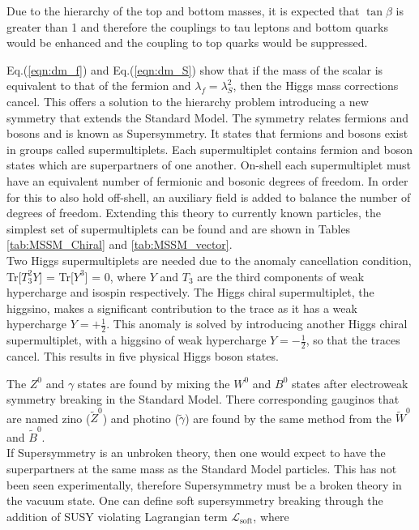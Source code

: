 Due to the hierarchy of the top and bottom masses, it is expected that $\tan\beta$ is greater than 1 and therefore the couplings to tau leptons and bottom quarks would be enhanced and the coupling to top quarks would be suppressed.

Eq.(\ref{eqn:dm_f}) and Eq.(\ref{eqn:dm_S}) show that if the mass of the scalar is equivalent to that of the fermion and \(\lambda_f = \lambda_{S}^{2}\), then the Higgs mass corrections cancel. This offers a solution to the hierarchy problem introducing a new symmetry that extends the Standard Model. The symmetry relates fermions and bosons and is known as Supersymmetry. It states that fermions and bosons exist in groups called supermultiplets. Each supermultiplet contains fermion and boson states which are superpartners of one another. On-shell each supermultiplet must have an equivalent number of fermionic and bosonic degrees of freedom. In order for this to also hold off-shell, an auxiliary field is added to balance the number of degrees of freedom. Extending this theory to currently known particles, the simplest set of supermultiplets can be found and are shown in Tables \ref{tab:MSSM_Chiral} and \ref{tab:MSSM_vector}. \\

Two Higgs supermultiplets are needed due to the anomaly cancellation condition, Tr[\(T_{3}^{2}Y\)] = Tr[\(Y^3\)] = 0, where \(Y\) and \(T_3\) are the third components of weak hypercharge and isospin respectively. The Higgs chiral supermultiplet, the higgsino, makes a significant contribution to the trace as it has a weak hypercharge \(Y=+\frac{1}{2}\). This anomaly is solved by introducing another Higgs chiral supermultiplet, with a higgsino of weak hypercharge \(Y=-\frac{1}{2}\), so that the traces cancel. This results in five physical Higgs boson states. 

The \(Z^{0}\) and \(\gamma\) states are found by mixing the \(W^0\) and \(B^0\) states after electroweak symmetry breaking in the Standard Model. There corresponding gauginos that are named zino (\(\tilde{Z}^0\)) and photino (\(\tilde{\gamma}\)) are found by the same method from the \(\tilde{W}^0\) and \(\tilde{B}^0\). \\

If Supersymmetry is an unbroken theory, then one would expect to have the superpartners at the same mass as the Standard Model particles. This has not been seen experimentally, therefore Supersymmetry must be a broken theory in the vacuum state. One can define soft supersymmetry breaking through the addition of SUSY violating Lagrangian term \(\mathcal{L}_{\text{soft}}\), where

